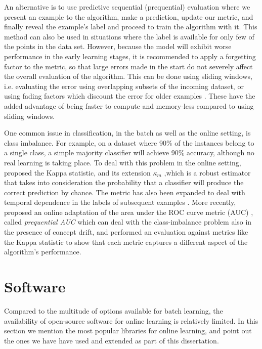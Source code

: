 An alternative is to use
predictive sequential (prequential) evaluation where we present
an example to the algorithm, make a prediction, update our metric,
and finally reveal the example's label and proceed to train the
algorithm with it. This method can also be used in situations
where the label is available for only few of the points in the
data set. However, because the model will exhibit worse performance
in the early learning stages, it is recommended to apply a forgetting
factor to the metric, so that large errors made in the start do
not severely affect the overall evaluation of the algorithm. This
can be done using sliding windows, i.e. evaluating the error using
overlapping subsets of the incoming dataset, or using fading
factors which discount the error for older examples \cite{online-evaluation-kdd}.
These have the added advantage of being faster to compute and memory-less
compared to using sliding windows.

One common issue in classification, in the batch as well as the online setting, is class
imbalance.
For example, on a dataset where 90\% of the instances belong to a single
class, a simple majority classifier will achieve 90\% accuracy, although no
real learning is taking place.
To deal with this problem in the online setting, \citet{kappa-statistic}
proposed the Kappa statistic, and its extension $\kappa_m$ \cite{kappa-m},which is a robust estimator that takes into consideration
the probability that a classifier will produce the correct prediction by chance.
The metric has also been expanded to deal with temporal dependence
in the labels of subsequent examples \cite{temporal-dependence}.
More recently, \citet{prequential-auc} proposed an online adaptation
of the area under the ROC curve metric (AUC) \cite{auc}, called
\emph{prequential AUC} which can deal with the class-imbalance
problem also in the presence of concept drift, and performed
an evaluation against metrics like the Kappa statistic to show
that each metric captures a different aspect of the algorithm's performance.

\section{Software}
\label{sec:bg-ol-software}

Compared to the multitude of options available for batch learning, the availability
of open-source software for online learning is relatively limited. In this section we
mention the most popular libraries for online learning, and point out the ones we have have used
and extended as part of this dissertation.

